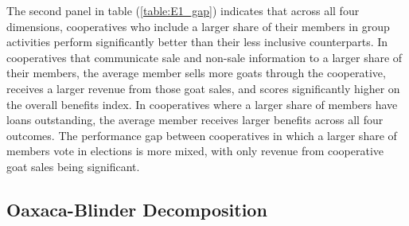 \documentclass[11pt]{article}
\begin{document}
The second panel in table (\ref{table:E1_gap}) indicates that across all four dimensions, cooperatives who include a larger share of their members in group activities perform significantly better than their less inclusive counterparts. In cooperatives that communicate sale and non-sale information to a larger share of their members, the average member sells more goats through the cooperative, receives a larger revenue from those goat sales, and scores significantly higher on the overall benefits index. In cooperatives where a larger share of members have loans outstanding, the average member receives larger benefits across all four outcomes. The performance gap between cooperatives in which a larger share of members vote in elections is more mixed, with only revenue from cooperative goat sales being significant. 


\subsection{Oaxaca-Blinder Decomposition}
\end{document}
